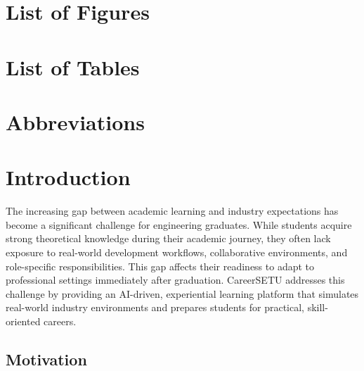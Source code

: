 \documentclass[12pt,a4paper]{report}
\begin{document}
\chapter*{List of Figures}
\listoffigures
\newpage

\chapter*{List of Tables}
\listoftables
\newpage

\chapter*{Abbreviations}

\begin{acronym}[AI]
\end{acronym}

\newpage
{}


\chapter{Introduction}

The increasing gap between academic learning and industry expectations has become a
significant challenge for engineering graduates. While students acquire strong theoretical
knowledge during their academic journey, they often lack exposure to real-world
development workflows, collaborative environments, and role-specific responsibilities.
This gap affects their readiness to adapt to professional settings immediately after
graduation. CareerSETU addresses this challenge by providing an AI-driven, experiential
learning platform that simulates real-world industry environments and prepares students
for practical, skill-oriented careers.

\section{Motivation}
\end{document}
